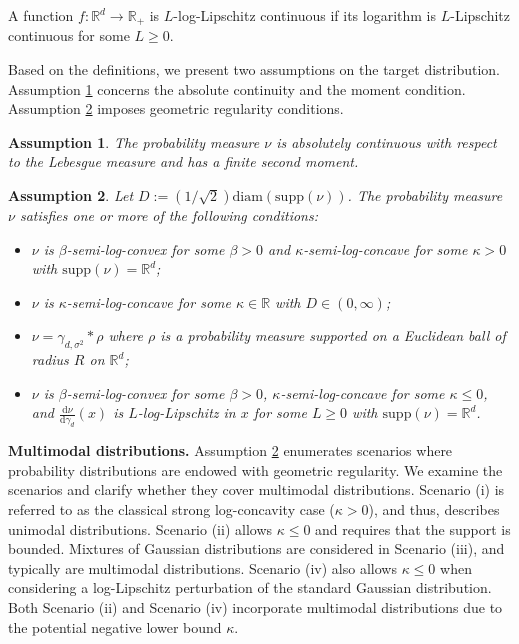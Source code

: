 \documentclass[twoside,11pt]{article}
\def\sR{{\mathbb{R}}}
\newcommand{\diff}{\mathrm{d}}
\newtheorem{assumption}{Assumption}
\numberwithin{equation}{section}
\begin{document}
\begin{definition}
\label{def:log-lip}
A function $f: \sR^d \to \sR_+$ is $L$-log-Lipschitz continuous if its logarithm is $L$-Lipschitz continuous for some $L \ge 0$.
\end{definition}

Based on the definitions, we present two assumptions on the target distribution.
Assumption \ref{assump:well-defined} concerns the absolute continuity and the moment condition.
Assumption \ref{assump:geom-prop} imposes geometric regularity conditions.

\begin{assumption} \label{assump:well-defined}
    The probability measure $\nu$ is absolutely continuous with respect to the Lebesgue measure and has a finite second moment.
\end{assumption}

\begin{assumption}
 \label{assump:geom-prop}
    Let $D := (1 / \sqrt{2}) \mathrm{diam} (\mathrm{supp}(\nu))$. The probability measure $\nu$ satisfies one or more of the following conditions:
    \begin{itemize}
        \item[(i)]    $\nu$ is $\beta$-semi-log-convex for some $\beta >0$ and $\kappa$-semi-log-concave for some $\kappa > 0$ with $\mathrm{supp}(\nu) = \sR^d$;
        \item[(ii)]   $\nu$ is $\kappa$-semi-log-concave for some $\kappa \in \sR$ with $D \in (0, \infty)$;
        \item[(iii)]  $\nu = \gamma_{d, \sigma^2} * \rho$  where $\rho$ is a probability measure supported on a Euclidean ball of radius $R$ on $\mathbb R^d$;
        \item[(iv)]   $\nu$ is $\beta$-semi-log-convex for some $\beta >0$, $\kappa$-semi-log-concave for some $\kappa \le 0$, and $\frac{\diff \nu}{\diff \gamma_d}(x)$ is $L$-log-Lipschitz in $x$ for some $L \ge 0$ with $\mathrm{supp}(\nu) = \sR^d$.
    \end{itemize}
\end{assumption}

    \textbf{Multimodal distributions.}
    Assumption \ref{assump:geom-prop} enumerates scenarios where probability distributions are endowed with geometric regularity.
    We examine the scenarios and clarify whether they cover multimodal distributions.
    Scenario (i) is referred to as the classical strong log-concavity case ($\kappa > 0$), and thus, describes unimodal distributions.
    Scenario (ii) allows $\kappa \le 0$ and requires that the support is bounded.
    Mixtures of Gaussian distributions are considered in Scenario (iii), and typically are multimodal distributions.
    Scenario (iv) also allows $\kappa \le 0$ when considering a log-Lipschitz perturbation of the standard Gaussian distribution.
    Both Scenario (ii) and Scenario (iv) incorporate multimodal distributions due to the potential
     negative lower bound $\kappa$.
\end{document}
